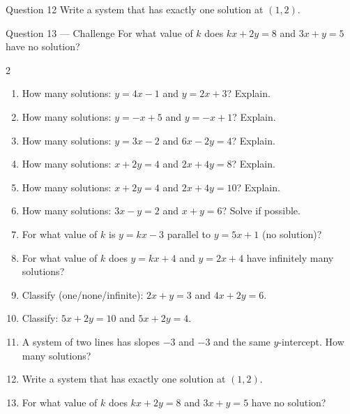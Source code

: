 \documentclass[11pt]{article}
\begin{document}
\begin{qbox}{Question 12}
Write a system that has exactly one solution at $(1,2)$.\workspace{2.6cm}
\end{qbox}

\begin{qbox}{Question 13 --- Challenge}
For what value of $k$ does $kx+2y=8$ and $3x+y=5$ have no solution?\workspace{3.0cm}
\end{qbox}

\clearpage
{}

\begin{recapbox}
\begin{multicols}{2}
\small
\begin{enumerate}[leftmargin=*,itemsep=3pt]
  \item How many solutions: $y=4x-1$ and $y=2x+3$? Explain.
  \item How many solutions: $y=-x+5$ and $y=-x+1$? Explain.
  \item How many solutions: $y=3x-2$ and $6x-2y=4$? Explain.
  \item How many solutions: $x+2y=4$ and $2x+4y=8$? Explain.
  \item How many solutions: $x+2y=4$ and $2x+4y=10$? Explain.
  \item How many solutions: $3x-y=2$ and $x+y=6$? Solve if possible.
  \item For what value of $k$ is $y=kx-3$ parallel to $y=5x+1$ (no solution)?
  \item For what value of $k$ does $y=kx+4$ and $y=2x+4$ have infinitely many solutions?
  \item Classify (one/none/infinite): $2x+y=3$ and $4x+2y=6$.
  \item Classify: $5x+2y=10$ and $5x+2y=4$.
  \item A system of two lines has slopes $-3$ and $-3$ and the same $y$-intercept. How many solutions?
  \item Write a system that has exactly one solution at $(1,2)$.
  \item For what value of $k$ does $kx+2y=8$ and $3x+y=5$ have no solution?
\end{enumerate}
\end{multicols}
\end{recapbox}
\end{document}
